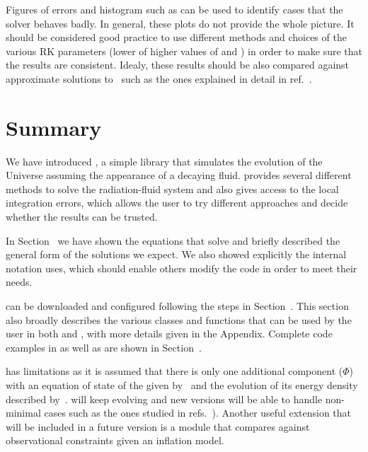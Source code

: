 \documentclass[11pt,a4paper]{article}
\begin{document}
Figures of errors and histogram such as  can be used to identify cases that the solver behaves badly. In general, these plots do not provide the whole picture. It should be considered good practice to use different methods and choices of the various RK parameters (\eg lower of higher values of  and ) in order to make sure that the results are consistent. Idealy, these results should be also compared against approximate solutions to~ such as the ones explained in detail in ref.~\cite{Arias:2020qty}.

\section{Summary}\label{sec:summary}
%
We have introduced \nsc, a simple library that simulates the evolution of the Universe assuming the appearance of a decaying fluid. \nsc provides several different methods to solve the radiation-fluid system and also gives access to the local integration errors, which allows the user to try different approaches and decide whether the results can be trusted.

In Section~ we have shown the equations that \nsc solve and briefly described the general form of the solutions we expect. We also showed explicitly the internal notation \nsc uses, which should enable others modify the code in order to meet their needs. 

\nsc can be downloaded and configured following the steps in Section~. This section also broadly describes the various classes and functions that can be used by the user in both \CPP and \PY, with more details given in the Appendix. Complete code examples in \CPP as well as \PY are shown in Section~.

\nsc has limitations as it is assumed that there is only one additional component ($\Phi$) with an equation of state of the given by~ and the evolution of its energy density described by~. \nsc will keep evolving and new versions will be able to handle non-minimal cases such as the ones studied in refs.~\cite{Dienes:2021woi,Ahmed:2021fvt,Barman:2022tzk,Arias:2022qjt}). Another useful extension that will be included in a future version is a module that compares against observational constraints given an inflation model. 
\end{document}
